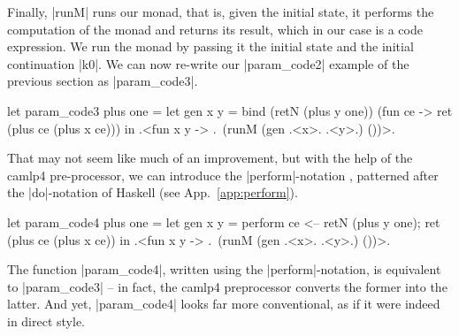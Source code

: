 \documentclass{elsart}
\begin{document}
Finally, |runM| runs our monad, that is, given the initial state,
it performs the computation of
the monad and returns its result, which in our case is a code
expression. We run the monad by passing it the initial state and the
initial continuation |k0|. We can now re-write our |param_code2|
example of the previous section as |param_code3|.
\begin{code}
let param_code3 plus one =
  let gen x y = bind (retN (plus y one)) (fun ce -> 
                ret (plus ce (plus x ce)))
  in .<fun x y -> .~(runM (gen .<x>. .<y>.) ())>.
\end{code}
%
That may not seem like much of an improvement, but with the help of the
camlp4 pre-processor, we can introduce the |perform|-notation
\cite{metamonadsURL}, patterned after the |do|-notation of Haskell (see
App.~\ref{app:perform}).
\begin{code}
let param_code4 plus one =
  let gen x y = perform ce <-- retN (plus y one);
                        ret (plus ce (plus x ce))
  in .<fun x y -> .~(runM (gen .<x>. .<y>.) ())>.
\end{code}
The function
|param_code4|, written using the |perform|-notation, is equivalent to
|param_code3| -- in fact, the camlp4 preprocessor converts the
former into the latter. And yet, |param_code4| looks far more
conventional, as if it were indeed in direct style.
\end{document}
